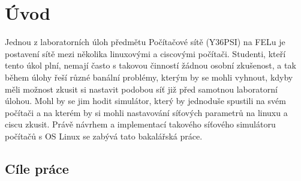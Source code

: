 \chapter{Úvod}




Jednou z laboratorních úloh předmětu Počítačové sítě (Y36PSI) na FELu je postavení sítě mezi několika linuxovými a ciscovými počítači. Studenti, kteří tento úkol plní, nemají často s takovou činností žádnou osobní zkušenost, a tak během úlohy řeší různé banální problémy, kterým by se mohli vyhnout, kdyby měli možnost zkusit si nastavit podobou síť již před samotnou laboratorní úlohou. Mohl by se jim hodit simulátor, který by jednoduše spustili na svém počítači a na kterém by si mohli nastavování síťových parametrů na linuxu a ciscu zkusit. Právě návrhem a implementací takového síťového simulátoru počítačů s OS Linux se zabývá tato bakalářská práce. 


\section{Cíle práce}

